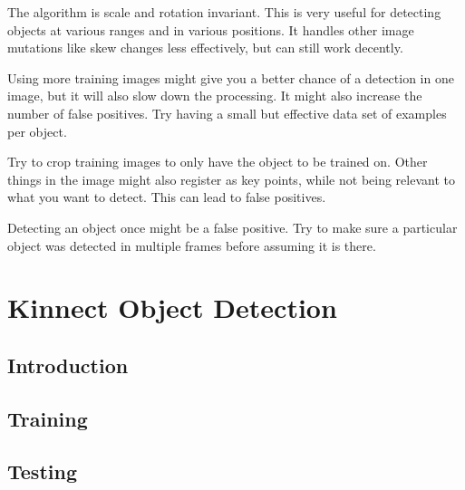 \documentclass[a4paper, 12pt, oneside]{report}
\begin{document}
The algorithm is scale and rotation invariant. 
This is very useful for detecting objects at various ranges and in various positions.
It handles other image mutations like skew changes less effectively, but can still work decently.

Using more training images might give you a better chance of a detection in one image, but it will also slow down the processing.
It might also increase the number of false positives.
Try having a small but effective data set of examples per object.

Try to crop training images to only have the object to be trained on.
Other things in the image might also register as key points, while not being relevant to what you want to detect.
This can lead to false positives.

Detecting an object once might be a false positive.
Try to make sure a particular object was detected in multiple frames before assuming it is there.

\chapter{Kinnect Object Detection}
\section{Introduction}
\section{Training}
\section{Testing}
\end{document}
